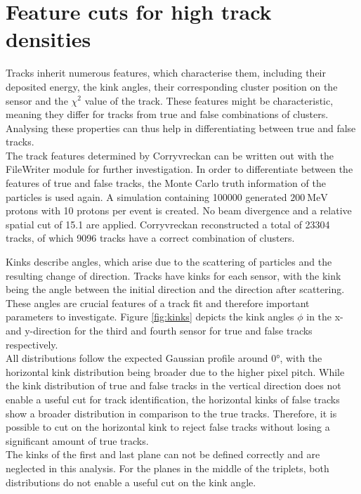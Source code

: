 
\section{Feature cuts for high track densities}\label{sec:feature}
Tracks inherit numerous features, which characterise them,
including their deposited energy, the kink angles, their corresponding cluster position on the sensor and the $\chi^2$ value of the track.
These features might be characteristic, meaning they differ for tracks from true and false combinations of clusters.
Analysing these properties can thus help in differentiating between true and false tracks. \\
The track features determined by Corryvreckan can be written out with the FileWriter module for further investigation.
In order to differentiate between the features of true and false tracks, the Monte Carlo truth information of the particles is used again.
A simulation containing 100000 generated $\SI{200}{\mega\eV}$ protons with 10 protons per event is created. No beam divergence and a relative spatial cut of 15.1 are applied.
Corryvreckan reconstructed a total of 23304 tracks, of which 9096 tracks have a correct combination of clusters.

Kinks describe angles, which arise due to the scattering of particles and the resulting change of direction. Tracks have kinks for each sensor, with the kink being
the angle between the initial direction and the direction after scattering. These angles are crucial features of a track fit and therefore important parameters to investigate.
Figure \ref{fig:kinks} depicts the kink angles $\phi$ in the x- and y-direction for the third and fourth sensor for true and false tracks respectively. \\
All distributions follow the expected Gaussian profile around 0°, with the horizontal kink distribution being broader due to the higher pixel pitch.
While the kink distribution of true and false tracks in the vertical direction does not enable a useful
cut for track identification, the horizontal kinks of false tracks show a broader distribution in comparison to the true tracks. Therefore, it is
possible to cut on the horizontal kink to reject false tracks without losing a significant amount of true tracks. \\
The kinks of the first and last plane can not be defined correctly and are neglected in this analysis. For the planes in the middle of the triplets, both
distributions do not enable a useful cut on the kink angle.

